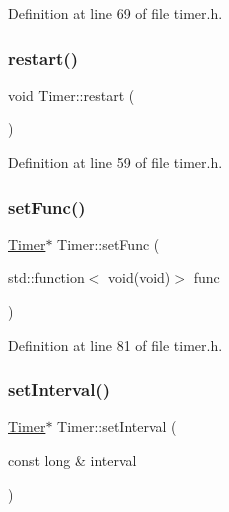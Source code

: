 Definition at line 69 of file timer.\+h.

\mbox{\label{classTimer_aa3f7871196bb56202af2bc982bfbfff6}} 
\subsubsection{\texorpdfstring{restart()}{restart()}}
{\footnotesize\ttfamily void Timer\+::restart (\begin{DoxyParamCaption}{ }\end{DoxyParamCaption})\hspace{0.3cm}{\ttfamily [inline]}}



Definition at line 59 of file timer.\+h.

\mbox{\label{classTimer_a70653847aa7ae39d66379597e37db6af}} 
\subsubsection{\texorpdfstring{set\+Func()}{setFunc()}}
{\footnotesize\ttfamily \hyperlink{classTimer}{Timer}$\ast$ Timer\+::set\+Func (\begin{DoxyParamCaption}\item[{std\+::function$<$ void(void)$>$}]{func }\end{DoxyParamCaption})\hspace{0.3cm}{\ttfamily [inline]}}



Definition at line 81 of file timer.\+h.

\mbox{\label{classTimer_abdc4f70c2dc58ee37b62861c842b77f0}} 
\subsubsection{\texorpdfstring{set\+Interval()}{setInterval()}}
{\footnotesize\ttfamily \hyperlink{classTimer}{Timer}$\ast$ Timer\+::set\+Interval (\begin{DoxyParamCaption}\item[{const long \&}]{interval }\end{DoxyParamCaption})\hspace{0.3cm}{\ttfamily [inline]}}



